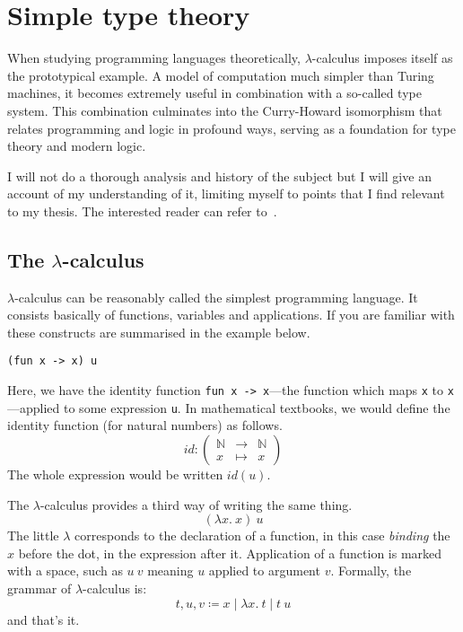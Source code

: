 \chapter{Simple type theory}

When studying programming languages theoretically, \(\lambda\)-calculus imposes
itself as the prototypical example. A model of computation much simpler than
Turing machines, it becomes extremely useful in combination with a so-called
type system. This combination culminates into the Curry-Howard isomorphism that
relates programming and logic in profound ways, serving as a foundation for
type theory and modern logic.

I will not do a thorough analysis and history of the subject but I will give an
account of my understanding of it, limiting myself to points that I find
relevant to my thesis. The interested reader can refer
to~.

\section{The \(\lambda\)-calculus}

\(\lambda\)-calculus can be reasonably called the simplest programming language.
It consists basically of functions, variables and applications.
If you are familiar with \ocaml these constructs are summarised in the example
below.
\begin{verbatim}
(fun x -> x) u
\end{verbatim}
Here, we have the identity function \texttt{fun x -> x}---\ie the
function which maps \texttt{x} to \texttt{x}---applied to
some expression \texttt{u}.
In mathematical textbooks, we would define the identity function (for natural
numbers) as follows.
\[
  \mathit{id} :
  \left(
  \begin{array}{lcl}
    \mathbb{N} &\to& \mathbb{N} \\
    x &\mapsto& x
  \end{array}
  \right)
\]
The whole expression would be written \(\mathit{id}(u)\).

The \(\lambda\)-calculus provides a third way of writing the same thing.
\[
  (\lambda x.\ x)\ u
\]
The little \(\lambda\) corresponds to the declaration of a function, in this
case \emph{binding} the \(x\) before the dot, in the expression after it.
Application of a function is marked with a space, such as \(u\ v\) meaning
\(u\) applied to argument \(v\).
Formally, the grammar of \(\lambda\)-calculus is:
\[
  t, u, v \coloneqq x \mid \lambda x.\ t \mid t\ u
\]
and that's it.

